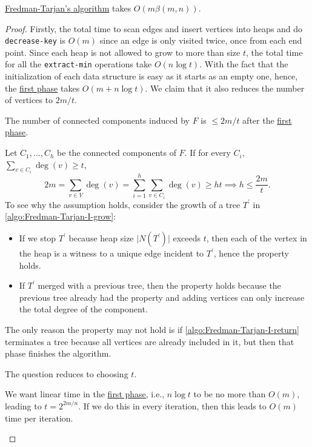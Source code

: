 \begin{theorem}\label{thm:Fredman-Tarjan}
	\hyperref[algo:Fredman-Tarjan]{Fredman-Tarjan's algorithm} takes \(O(m \beta (m, n))\).
\end{theorem}
\begin{proof}
	Firstly, the total time to scan edges and insert vertices into heaps and do \texttt{decrease-key} is \(O(m)\) since an edge is only visited twice, once from each end point. Since each heap is not allowed to grow to more than size \(t\), the total time for all the \texttt{extract-min} operations take \(O(n \log t)\). With the fact that the initialization of each data structure is easy as it starts as an empty one, hence, the \hyperref[algo:Fredman-Tarjan-I]{first phase} takes \(O(m + n \log t)\). We claim that it also reduces the number of vertices to \(2m / t\).

	\begin{claim}
		The number of connected components induced by \(F\) is \(\leq 2m / t\) after the \hyperref[algo:Fredman-Tarjan-I]{first phase}.
	\end{claim}
	\begin{explanation}
		Let \(C_1, \dots , C_h\) be the connected components of \(F\). If for every \(C_i\), \(\sum_{v \in C_i} \deg(v) \geq t\),
		\[
			2m
			= \sum_{v \in V} \deg(v)
			= \sum_{i=1}^{h} \sum_{v \in C_i} \deg(v)
			\geq ht
			\implies h \leq \frac{2m}{t}.
		\]
		To see why the assumption holds, consider the growth of a tree \(T^{\prime}\) in \autoref{algo:Fredman-Tarjan-I-grow}:
		\begin{itemize}
			\item If we stop \(T^{\prime}\) because heap size \(\lvert N(T^{\prime} ) \rvert \) exceeds \(t\), then each of the vertex in the heap is a witness to a unique edge incident to \(T^{\prime}\), hence the property holds.
			\item If \(T^{\prime}\) merged with a previous tree, then the property holds because the previous tree already had the property and adding vertices can only increase the total degree of the component.
		\end{itemize}
		The only reason the property may not hold is if \autoref{algo:Fredman-Tarjan-I-return} terminates a tree because all vertices are already included in it, but then that phase finishes the algorithm.
	\end{explanation}

	The question reduces to choosing \(t\).

	\begin{intuition}
		We want linear time in the \hyperref[algo:Fredman-Tarjan-I]{first phase}, i.e., \(n \log t\) to be no more than \(O(m)\), leading to \(t = 2^{2m / n}\). If we do this in every iteration, then this leads to \(O(m)\) time per iteration.
	\end{intuition}


\end{proof}
